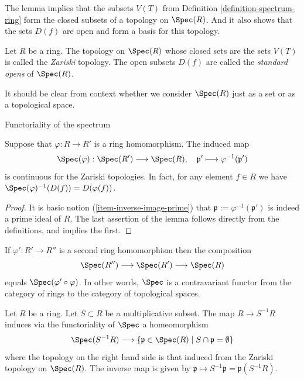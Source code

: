 \noindent
The lemma implies that the subsets $V(T)$ from
Definition \ref{definition-spectrum-ring} form the closed
subsets of a topology on $\Spec(R)$. And it also shows that
the sets $D(f)$ are open and form a basis for this
topology.

\begin{definition}
\label{definition-Zariski-topology}
Let $R$ be a ring.
The topology on $\Spec(R)$ whose closed sets are the
sets $V(T)$ is called the {\it Zariski} topology. The open
subsets $D(f)$ are called the {\it standard opens} of $\Spec(R)$.
\end{definition}

\noindent
It should be clear from context whether we consider $\Spec(R)$
just as a set or as a topological space.

\begin{lemma}
\label{lemma-spec-functorial}
\begin{slogan}
Functoriality of the spectrum
\end{slogan}
Suppose that $\varphi : R \to R'$ is a ring homomorphism.
The induced map
$$
\Spec(\varphi) : \Spec(R') \longrightarrow \Spec(R),
\quad
\mathfrak p' \longmapsto \varphi^{-1}(\mathfrak p')
$$
is continuous for the Zariski topologies. In fact, for any
element $f \in R$ we have
$\Spec(\varphi)^{-1}(D(f)) = D(\varphi(f))$.
\end{lemma}

\begin{proof}
It is basic notion (\ref{item-inverse-image-prime}) that
$\mathfrak p := \varphi^{-1}(\mathfrak p')$
is indeed a prime ideal of $R$. The last assertion
of the lemma follows directly from the definitions,
and implies the first.
\end{proof}

\noindent
If $\varphi' : R' \to R''$ is a second ring homomorphism
then the composition
$$
\Spec(R'')
\longrightarrow
\Spec(R')
\longrightarrow
\Spec(R)
$$
equals $\Spec(\varphi' \circ \varphi)$. In other
words, $\Spec$ is a contravariant functor from the
category of rings to the category of topological spaces.

\begin{lemma}
\label{lemma-spec-localization}
Let $R$ be a ring. Let $S \subset R$ be a multiplicative subset.
The map $R \to S^{-1}R$ induces via the functoriality of $\Spec$
a homeomorphism
$$
\Spec(S^{-1}R)
\longrightarrow
\{\mathfrak p \in \Spec(R) \mid S \cap \mathfrak p = \emptyset \}
$$
where the topology on the right hand side is that induced from the
Zariski topology on $\Spec(R)$. The inverse map is given
by $\mathfrak p \mapsto S^{-1}\mathfrak p = \mathfrak p(S^{-1}R)$.
\end{lemma}

